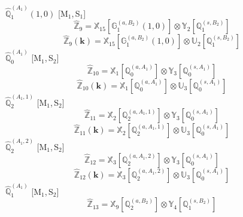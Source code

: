 \documentclass[fleqn,10pt,landscape]{article}
\begin{document}
\begin{itemize}
\vspace{4mm}
\noindent {} $\,\,\,\hat{\mathbb{Q}}_{1}^{(A_{1})}(1,0)$ [M$_{1}$,\,S$_{1}$]
\begin{dmath*}
\hat{\mathbb{Z}}_{9}=\mathbb{X}_{15}[\mathbb{G}_{1}^{(a,B_{2})}(1,0)] \otimes\mathbb{Y}_{2}[\mathbb{Q}_{1}^{(s,B_{2})}]
\end{dmath*}
\begin{dmath*}
\hat{\mathbb{Z}}_{9}(\bm{k})=\mathbb{X}_{15}[\mathbb{G}_{1}^{(a,B_{2})}(1,0)] \otimes\mathbb{U}_{2}[\mathbb{Q}_{1}^{(s,B_{2})}]
\end{dmath*}
\vspace{4mm}
\noindent {} $\,\,\,\hat{\mathbb{Q}}_{0}^{(A_{1})}$ [M$_{1}$,\,S$_{2}$]
\begin{dmath*}
\hat{\mathbb{Z}}_{10}=\mathbb{X}_{1}[\mathbb{Q}_{0}^{(a,A_{1})}] \otimes\mathbb{Y}_{3}[\mathbb{Q}_{0}^{(s,A_{1})}]
\end{dmath*}
\begin{dmath*}
\hat{\mathbb{Z}}_{10}(\bm{k})=\mathbb{X}_{1}[\mathbb{Q}_{0}^{(a,A_{1})}] \otimes\mathbb{U}_{3}[\mathbb{Q}_{0}^{(s,A_{1})}]
\end{dmath*}
\vspace{4mm}
\noindent {} $\,\,\,\hat{\mathbb{Q}}_{2}^{(A_{1},1)}$ [M$_{1}$,\,S$_{2}$]
\begin{dmath*}
\hat{\mathbb{Z}}_{11}=\mathbb{X}_{2}[\mathbb{Q}_{2}^{(a,A_{1},1)}] \otimes\mathbb{Y}_{3}[\mathbb{Q}_{0}^{(s,A_{1})}]
\end{dmath*}
\begin{dmath*}
\hat{\mathbb{Z}}_{11}(\bm{k})=\mathbb{X}_{2}[\mathbb{Q}_{2}^{(a,A_{1},1)}] \otimes\mathbb{U}_{3}[\mathbb{Q}_{0}^{(s,A_{1})}]
\end{dmath*}
\vspace{4mm}
\noindent {} $\,\,\,\hat{\mathbb{Q}}_{2}^{(A_{1},2)}$ [M$_{1}$,\,S$_{2}$]
\begin{dmath*}
\hat{\mathbb{Z}}_{12}=\mathbb{X}_{3}[\mathbb{Q}_{2}^{(a,A_{1},2)}] \otimes\mathbb{Y}_{3}[\mathbb{Q}_{0}^{(s,A_{1})}]
\end{dmath*}
\begin{dmath*}
\hat{\mathbb{Z}}_{12}(\bm{k})=\mathbb{X}_{3}[\mathbb{Q}_{2}^{(a,A_{1},2)}] \otimes\mathbb{U}_{3}[\mathbb{Q}_{0}^{(s,A_{1})}]
\end{dmath*}
\vspace{4mm}
\noindent {} $\,\,\,\hat{\mathbb{Q}}_{1}^{(A_{1})}$ [M$_{1}$,\,S$_{2}$]
\begin{dmath*}
\hat{\mathbb{Z}}_{13}=\mathbb{X}_{9}[\mathbb{Q}_{2}^{(a,B_{2})}] \otimes\mathbb{Y}_{4}[\mathbb{Q}_{1}^{(s,B_{2})}]

\end{dmath*}
\end{itemize}
\end{document}
